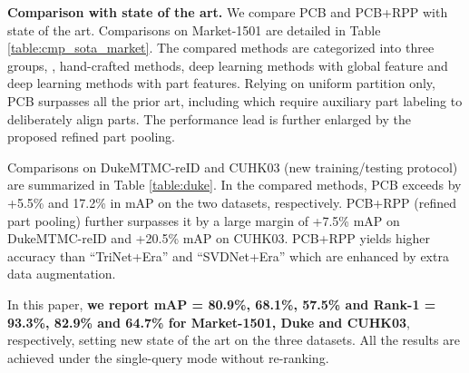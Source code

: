 \documentclass[10pt,twocolumn,letterpaper]{article}
\begin{document}

\textbf{Comparison with state of the art.}
We compare PCB and PCB+RPP with state of the art. Comparisons on Market-1501 are detailed in Table \ref{table:cmp_sota_market}. The compared methods are categorized into three groups, \ie, hand-crafted methods, deep learning methods with global feature and deep learning methods with part features. Relying on uniform partition only, PCB surpasses all the prior art, including \cite{Su2017Pose,Wei2017GLAD} which require auxiliary part labeling to deliberately align parts. The performance lead is further enlarged by the proposed refined part pooling. %

Comparisons on DukeMTMC-reID and CUHK03 (new training/testing protocol) are summarized in Table \ref{table:duke}. In the compared methods,  PCB exceeds \cite{ChenPerson_multiscale} by +5.5\% and 17.2\% in mAP on the two datasets, respectively. PCB+RPP (refined part pooling) further surpasses it by a large margin of +7.5\% mAP on DukeMTMC-reID and +20.5\% mAP on CUHK03. PCB+RPP yields higher accuracy than ``TriNet+Era'' and ``SVDNet+Era'' \cite{Zhong2017Random} which are enhanced by extra data augmentation. 

In this paper, \textbf{we report mAP = 80.9\%, 68.1\%, 57.5\% and Rank-1 = 93.3\%, 82.9\% and 64.7\% for Market-1501, Duke and CUHK03}, respectively, setting new state of the art on the three datasets. All the results are achieved under the single-query mode without re-ranking. 
\end{document}
